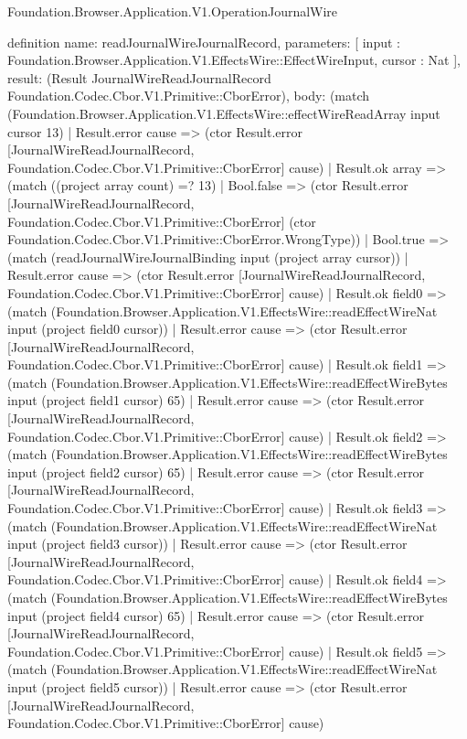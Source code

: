 \begin{lexlean}{Foundation.Browser.Application.V1.OperationJournalWire}
\begin{semanticmodule}
definition{
  name: readJournalWireJournalRecord,
  parameters: [
    input : Foundation.Browser.Application.V1.EffectsWire::EffectWireInput,
    cursor : Nat
  ],
  result: (Result JournalWireReadJournalRecord Foundation.Codec.Cbor.V1.Primitive::CborError),
  body: (match (Foundation.Browser.Application.V1.EffectsWire::effectWireReadArray input cursor 13)
    | Result.error cause => (ctor Result.error [JournalWireReadJournalRecord, Foundation.Codec.Cbor.V1.Primitive::CborError] cause)
    | Result.ok array => (match ((project array count) =? 13)
      | Bool.false => (ctor Result.error [JournalWireReadJournalRecord, Foundation.Codec.Cbor.V1.Primitive::CborError] (ctor Foundation.Codec.Cbor.V1.Primitive::CborError.WrongType))
      | Bool.true => (match (readJournalWireJournalBinding input (project array cursor))
        | Result.error cause => (ctor Result.error [JournalWireReadJournalRecord, Foundation.Codec.Cbor.V1.Primitive::CborError] cause)
        | Result.ok field0 => (match (Foundation.Browser.Application.V1.EffectsWire::readEffectWireNat input (project field0 cursor))
          | Result.error cause => (ctor Result.error [JournalWireReadJournalRecord, Foundation.Codec.Cbor.V1.Primitive::CborError] cause)
          | Result.ok field1 => (match (Foundation.Browser.Application.V1.EffectsWire::readEffectWireBytes input (project field1 cursor) 65)
            | Result.error cause => (ctor Result.error [JournalWireReadJournalRecord, Foundation.Codec.Cbor.V1.Primitive::CborError] cause)
            | Result.ok field2 => (match (Foundation.Browser.Application.V1.EffectsWire::readEffectWireBytes input (project field2 cursor) 65)
              | Result.error cause => (ctor Result.error [JournalWireReadJournalRecord, Foundation.Codec.Cbor.V1.Primitive::CborError] cause)
              | Result.ok field3 => (match (Foundation.Browser.Application.V1.EffectsWire::readEffectWireNat input (project field3 cursor))
                | Result.error cause => (ctor Result.error [JournalWireReadJournalRecord, Foundation.Codec.Cbor.V1.Primitive::CborError] cause)
                | Result.ok field4 => (match (Foundation.Browser.Application.V1.EffectsWire::readEffectWireBytes input (project field4 cursor) 65)
                  | Result.error cause => (ctor Result.error [JournalWireReadJournalRecord, Foundation.Codec.Cbor.V1.Primitive::CborError] cause)
                  | Result.ok field5 => (match (Foundation.Browser.Application.V1.EffectsWire::readEffectWireNat input (project field5 cursor))
                    | Result.error cause => (ctor Result.error [JournalWireReadJournalRecord, Foundation.Codec.Cbor.V1.Primitive::CborError] cause)
}
\end{semanticmodule}
\end{lexlean}
